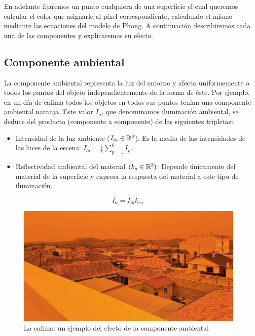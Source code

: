 En adelante fijaremos un punto cualquiera de una superficie el cual queremos calcular el color que asignarle al píxel correspondiente, calculando el mismo mediante las ecuaciones del modelo de Phong. A continuación describiremos cada una de las componentes y explicaremos su efecto.

\subsection{Componente ambiental}

La componente ambiental representa la luz del entorno y afecta uniformemente a todos los puntos del objeto independientemente de la forma de éste. Por ejemplo, en un día de calima todos los objetos en todos sus puntos tenían una componente ambiental naranja. Este valor $I_a$, que denominamos iluminación ambiental, se deduce del producto (componente a componente) de las siguientes tripletas:
\begin{itemize}
    \item Intensidad de la luz ambiente ($I_{la}\in\mathbb{R}^3$): Es la media de las intensidades de las luces de la escena: $I_{la}=\frac{1}{k}\sum_{p=1}^k I_p$.
    \item Reflectividad ambiental del material $(k_a\in\mathbb{R}^3)$: Depende únicamente del material de la superficie y expresa la respuesta del material a este tipo de iluminación. 
\end{itemize}
\begin{equation}
    I_a = I_{la} k_a,
\end{equation}

\begin{figure} [ht]
    \centering
    \includegraphics[scale = 0.2]{img/C7/calima.jpg}
    \caption{La calima: un ejemplo del efecto de la componente ambiental}
    \label{fig:calima}
\end{figure}

